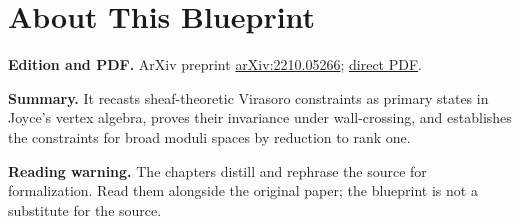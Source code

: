 

\chapter*{About This Blueprint}
\label{virasoro-constraints-moduli-sheaves-vertex-algebras-about}


\textbf{Edition and PDF.} ArXiv preprint \href{https://arxiv.org/abs/2210.05266}{arXiv:2210.05266}; \href{https://arxiv.org/pdf/2210.05266}{direct PDF}.

\textbf{Summary.} It recasts sheaf-theoretic Virasoro constraints as primary states in Joyce's vertex algebra, proves their invariance under wall-crossing, and establishes the constraints for broad moduli spaces by reduction to rank one.

\textbf{Reading warning.} The chapters distill and rephrase the source for formalization. Read them alongside the original paper; the blueprint is not a substitute for the source.











